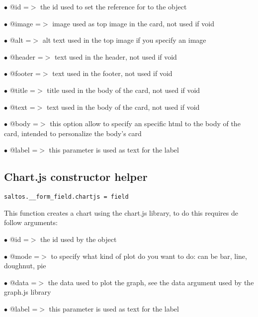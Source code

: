 \documentclass[a4paper]{book}
\begin{document}
\begin{compactitem}
\item[\color{myblue}$\bullet$] @id     =$>$ the id used to set the reference for to the object
\item[\color{myblue}$\bullet$] @image  =$>$ image used as top image in the card, not used if void
\item[\color{myblue}$\bullet$] @alt    =$>$ alt text used in the top image if you specify an image
\item[\color{myblue}$\bullet$] @header =$>$ text used in the header, not used if void
\item[\color{myblue}$\bullet$] @footer =$>$ text used in the footer, not used if void
\item[\color{myblue}$\bullet$] @title  =$>$ title used in the body of the card, not used if void
\item[\color{myblue}$\bullet$] @text   =$>$ text used in the body of the card, not used if void
\item[\color{myblue}$\bullet$] @body   =$>$ this option allow to specify an specific html to the body of the card, intended
           to personalize the body's card
\item[\color{myblue}$\bullet$] @label  =$>$ this parameter is used as text for the label
\end{compactitem}

\hypertarget{toc401}{}
\subsection{Chart.js constructor helper}

\begin{lstlisting}
saltos.__form_field.chartjs = field
\end{lstlisting}

This function creates a chart using the chart.js library, to do this requires de follow arguments:

\begin{compactitem}
\item[\color{myblue}$\bullet$] @id    =$>$ the id used by the object
\item[\color{myblue}$\bullet$] @mode  =$>$ to specify what kind of plot do you want to do: can be bar, line, doughnut, pie
\item[\color{myblue}$\bullet$] @data  =$>$ the data used to plot the graph, see the data argument used by the graph.js library
\item[\color{myblue}$\bullet$] @label =$>$ this parameter is used as text for the label
\end{compactitem}
\end{document}

